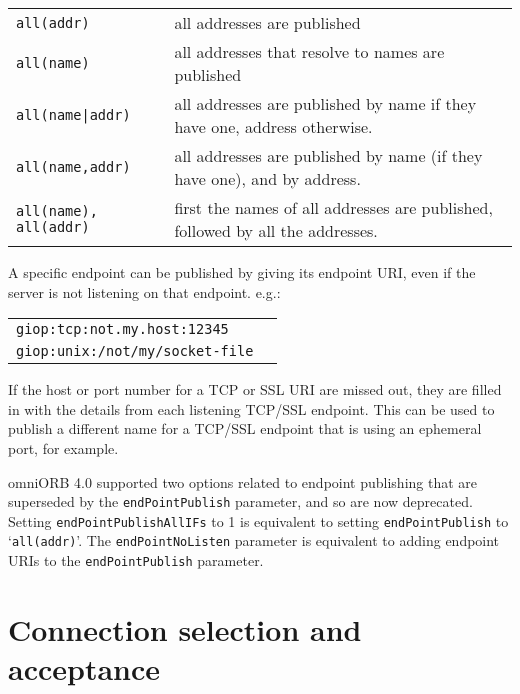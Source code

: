 \documentclass[11pt,twoside,a4paper]{book}
\newcommand{\code}[1]{\texttt{#1}}
\begin{document}
\vspace{\baselineskip}

\begin{tabular}{p{}p{}}
\code{all(addr)} & all addresses are published\\
\code{all(name)} & all addresses that resolve to names are published\\
\code{all(name|addr)} & all addresses are published by name if they have
                        one, address otherwise.\\
\code{all(name,addr)} & all addresses are published by name (if they
                        have one), and by address.\\
\code{all(name), all(addr)} & first the names of all addresses are published,
                             followed by all the addresses.\\
\end{tabular}

\vspace{\baselineskip}

\noindent
A specific endpoint can be published by giving its endpoint URI,
even if the server is not listening on that endpoint. e.g.:

\vspace{\baselineskip}

\begin{tabular}{p{}p{}}
\code{giop:tcp:not.my.host:12345}\\
\code{giop:unix:/not/my/socket-file}\\
\end{tabular}

\vspace{\baselineskip}

\noindent
If the host or port number for a TCP or SSL URI are missed out,
they are filled in with the details from each listening TCP/SSL
endpoint. This can be used to publish a different name for a
TCP/SSL endpoint that is using an ephemeral port, for example.

omniORB 4.0 supported two options related to endpoint publishing that
are superseded by the \code{endPointPublish} parameter, and so are now
deprecated. Setting \code{endPointPublishAllIFs} to 1 is equivalent to
setting \code{endPointPublish} to `\code{all(addr)}'. The
\code{endPointNoListen} parameter is equivalent to adding endpoint
URIs to the \code{endPointPublish} parameter.



\section{Connection selection and acceptance}
\end{document}
